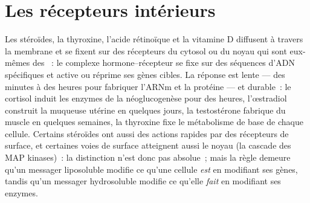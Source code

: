 \section{Les récepteurs intérieurs}

\begin{proposition}\label{prop:b2:cell-signalling:nuclear}
Les stéroïdes, la thyroxine, l'acide rétinoïque et la vitamine D
diffusent à travers la membrane et se fixent sur des récepteurs du
cytosol ou du noyau qui sont eux-mêmes des \emph{}~: le complexe hormone--récepteur se fixe sur des séquences
d'ADN spécifiques et active ou réprime ses gènes cibles. La réponse est
lente --- des minutes à des heures pour fabriquer l'ARNm et la protéine
--- et durable~: le cortisol induit les enzymes de la néoglucogenèse pour
des heures, l'œstradiol construit la muqueuse utérine en quelques jours,
la testostérone fabrique du muscle en quelques semaines, la thyroxine
fixe le métabolisme de base de chaque cellule. Certains stéroïdes ont
aussi des actions rapides par des récepteurs de surface, et certaines
voies de surface atteignent aussi le noyau (la cascade des MAP kinases)~:
la distinction n'est donc pas absolue~; mais la règle demeure qu'un
messager liposoluble modifie ce qu'une cellule \emph{est} en modifiant
ses gènes, tandis qu'un messager hydrosoluble modifie ce qu'elle
\emph{fait} en modifiant ses enzymes.
\end{proposition}

